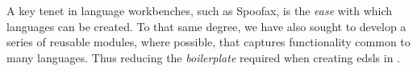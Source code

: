A key tenet in language workbenches, such as Spoofax, is the \emph{ease} with which languages can be created.
To that same degree, we have also sought to develop a series of reusable modules, where possible, that captures functionality common to many languages.
Thus reducing the \emph{boilerplate} required when creating \acp{edsl} in \Idris{}.



